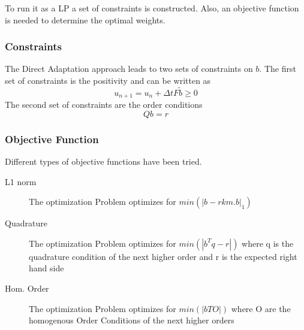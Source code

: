 \documentclass[a4paper]{scrartcl}
\numberwithin{equation}{section}
\theoremstyle{plain}
\theoremstyle{definition}
\numberwithin{theorem}{section}
\newcommand{\dt}{{\Delta t}}
\newcommand{\1}{\mathbbm{1}}
\begin{document}
To run it as a LP a set of constraints is constructed.  
Also, an objective function is needed to determine the optimal weights.

\subsubsection{Constraints}
The Direct Adaptation approach leads to two sets of constraints on $b$.
The first set of constraints is the positivity and can be written as 
\begin{equation}
u_{n+1}=u_n+\dt F \tilde{b} \geq 0
\end{equation}
The second set of constraints are the order conditions
\begin{equation}
Qb=r
\end{equation}





\subsubsection{Objective Function}
Different types of objective functions have been tried. 

\begin{description}

\item[L1 norm] The optimization Problem optimizes for $min(|b-rkm.b|_1)$
            
\item[Quadrature]   The optimization Problem optimizes for $min(|b^Tq-r|)$
                            where q is the quadrature condition of the next higher order 
                            and r is the expected right hand side
            
\item[Hom. Order]    The optimization Problem optimizes for $min(|bTO|)$ where O are the homogenous Order Conditions of the next higher orders
                            
 
\end{description}
\end{document}
